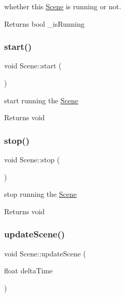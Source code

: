 whether this \hyperlink{class_scene}{Scene} is running or not. 

\begin{DoxyReturn}{Returns}
bool \+\_\+is\+Running 
\end{DoxyReturn}
\mbox{\label{class_scene_af1c55c1cd88c6665609f5cba96dff226}} 
\subsubsection{\texorpdfstring{start()}{start()}}
{\footnotesize\ttfamily void Scene\+::start (\begin{DoxyParamCaption}{ }\end{DoxyParamCaption})\hspace{0.3cm}{\ttfamily [inline]}}



start running the \hyperlink{class_scene}{Scene} 

\begin{DoxyReturn}{Returns}
void 
\end{DoxyReturn}
\mbox{\label{class_scene_add01794b17df2030e961468fc88cf2e7}} 
\subsubsection{\texorpdfstring{stop()}{stop()}}
{\footnotesize\ttfamily void Scene\+::stop (\begin{DoxyParamCaption}{ }\end{DoxyParamCaption})\hspace{0.3cm}{\ttfamily [inline]}}



stop running the \hyperlink{class_scene}{Scene} 

\begin{DoxyReturn}{Returns}
void 
\end{DoxyReturn}
\mbox{\label{class_scene_a7308b78f4cc3522369237623fd7a001f}} 
\subsubsection{\texorpdfstring{update\+Scene()}{updateScene()}}
{\footnotesize\ttfamily void Scene\+::update\+Scene (\begin{DoxyParamCaption}\item[{float}]{delta\+Time }\end{DoxyParamCaption})}



